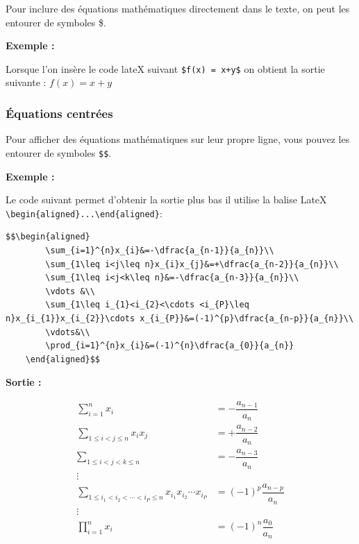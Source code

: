 \documentclass[
  12pt,
]{article}
\begin{document}
Pour inclure des équations mathématiques directement dans le texte, on
peut les entourer de symboles \$.

\textbf{Exemple :}

Lorsque l'on insère le code lateX suivant \texttt{\$f(x)\ =\ x+y\$} on
obtient la sortie suivante : \(f(x) = x+y\)

\subsubsection{Équations centrées}\label{uxe9quations-centruxe9es}

Pour afficher des équations mathématiques sur leur propre ligne, vous
pouvez les entourer de symboles \texttt{\$\$}.

\textbf{Exemple :}

Le code suivant permet d'obtenir la sortie plus bas il utilise la balise
LateX
\texttt{\textbackslash{}begin\{aligned\}...\textbackslash{}end\{aligned\}}:

\begin{verbatim}
$$\begin{aligned}
        \sum_{i=1}^{n}x_{i}&=-\dfrac{a_{n-1}}{a_{n}}\\
        \sum_{1\leq i<j\leq n}x_{i}x_{j}&=+\dfrac{a_{n-2}}{a_{n}}\\
        \sum_{1\leq i<j<k\leq n}&=-\dfrac{a_{n-3}}{a_{n}}\\
        \vdots &\\
        \sum_{1\leq i_{1}<i_{2}<\cdots <i_{P}\leq n}x_{i_{1}}x_{i_{2}}\cdots x_{i_{P}}&=(-1)^{p}\dfrac{a_{n-p}}{a_{n}}\\
        \vdots&\\
        \prod_{i=1}^{n}x_{i}&=(-1)^{n}\dfrac{a_{0}}{a_{n}}
    \end{aligned}$$
\end{verbatim}

\textbf{Sortie :}

\[\begin{aligned}
        \sum_{i=1}^{n}x_{i}&=-\dfrac{a_{n-1}}{a_{n}}\\
        \sum_{1\leq i<j\leq n}x_{i}x_{j}&=+\dfrac{a_{n-2}}{a_{n}}\\
        \sum_{1\leq i<j<k\leq n}&=-\dfrac{a_{n-3}}{a_{n}}\\
        \vdots &\\
        \sum_{1\leq i_{1}<i_{2}<\cdots <i_{P}\leq n}x_{i_{1}}x_{i_{2}}\cdots x_{i_{P}}&=(-1)^{p}\dfrac{a_{n-p}}{a_{n}}\\
        \vdots&\\
        \prod_{i=1}^{n}x_{i}&=(-1)^{n}\dfrac{a_{0}}{a_{n}}
    \end{aligned}\]
\end{document}
